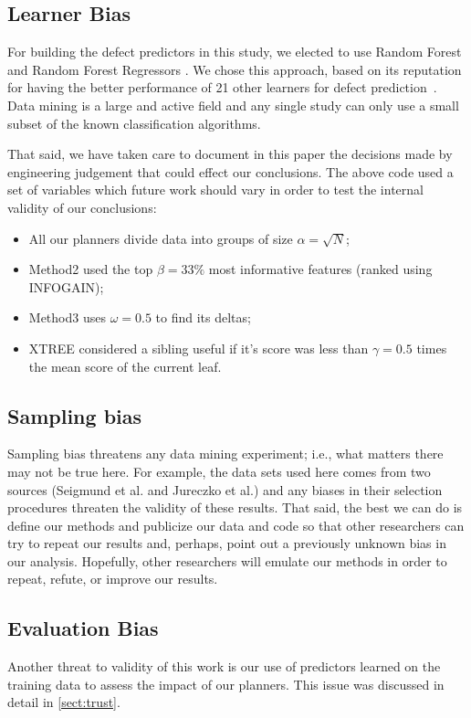 \documentclass{sig-alternate}
\newcommand{\bi}{\begin{itemize}}
\newcommand{\ei}{\end{itemize}}
\newcommand{\tion}[1]{\textsection\ref{sect:#1}}
\begin{document}
\subsection{ Learner Bias}
For building the defect predictors in this study, we elected
to use  Random Forest  and Random Forest Regressors .
We chose this approach,  based on its reputation for having the better  performance of 
21 other learners for defect prediction~\cite{lessmann}.
Data mining is a
large and active field and any single study can only use a small
subset of the known classification algorithms.  

That said, we have taken care to document in this paper the decisions made by engineering
judgement that could effect our conclusions. The above code used a set of variables which future
work should vary in order to test the internal validity of our conclusions:
\bi
\item All our planners divide data into groups of size $\alpha=\sqrt{N}$;
\item Method2 used the top $\beta=33\%$ most informative features (ranked using INFOGAIN);
\item Method3 uses  $\omega=0.5$ to find its deltas;
\item XTREE considered a sibling useful if it's score was less than $\gamma=0.5$ times the mean score of the current leaf.
 \ei

\subsection{  Sampling bias} 
Sampling bias threatens any data mining experiment; i.e., what matters
there may not be true here. For example, the data sets used here comes from two sources
(Seigmund et al. and Jureczko et al.) and any biases in their selection procedures
threaten the validity of these results. 
That said,
the best we can do is define our methods and publicize our data and code so that other researchers can
try to repeat our results and, perhaps, point out a previously unknown bias
in our analysis. Hopefully, other researchers will emulate our methods in
order to repeat, refute, or improve our results. 



\subsection{  Evaluation Bias}\label{sect:coc}
Another threat to validity of this work is our use
of predictors learned on the training data to assess the impact of our planners.
This issue was discussed in detail in \tion{trust}. 
\end{document}
